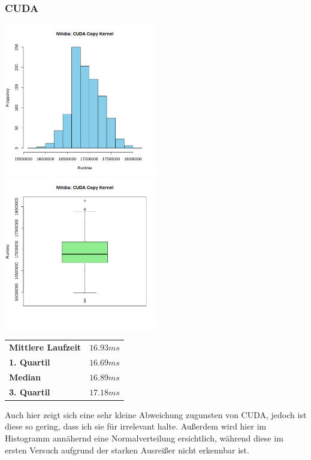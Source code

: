 \documentclass[12pt]{article}
\begin{document}
	\subsubsection*{CUDA}
	\includegraphics[width=0.5\textwidth]{../statistics/nvidia/cuda/histogram_copy.png}
	\includegraphics[width=0.5\textwidth]{../statistics/nvidia/cuda/boxplot_copy.png}
	\\
	\begin{center}
		\begin{tabular}{|l|l|}
			\toprule
			\textbf{Mittlere Laufzeit} 		& $16.93ms$ \\
			\textbf{1. Quartil}				& $16.69ms$ \\
			\textbf{Median}					& $16.89ms$  \\
			\textbf{3. Quartil}				& $17.18ms$  \\
			\bottomrule
		\end{tabular}
	\end{center}
	\medskip
	Auch hier zeigt sich eine sehr kleine Abweichung zugunsten von CUDA, jedoch ist diese so gering, dass ich sie für irrelevant halte.
	Außerdem wird hier im Histogramm annähernd eine Normalverteilung ersichtlich, während diese im ersten Versuch aufgrund der starken Ausreißer nicht erkennbar ist.
	
\end{document}
